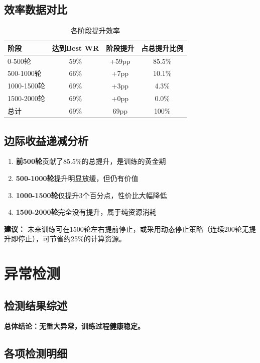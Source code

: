 \documentclass[12pt,a4paper]{article}
\begin{document}
\subsection{效率数据对比}
\begin{table}[H]
\centering
\caption{各阶段提升效率}
\begin{tabular}{lccc}
\toprule
\textbf{阶段} & \textbf{达到Best WR} & \textbf{阶段提升} & \textbf{占总提升比例} \\
\midrule
0-500轮 & 59\% & +59pp & 85.5\% \\
500-1000轮 & 66\% & +7pp & 10.1\% \\
1000-1500轮 & 69\% & +3pp & 4.3\% \\
1500-2000轮 & 69\% & +0pp & 0.0\% \\
\midrule
总计 & 69\% & 69pp & 100\% \\
\bottomrule
\end{tabular}
\end{table}

\subsection{边际收益递减分析}
\begin{enumerate}
\item \textbf{前500轮}贡献了85.5\%的总提升，是训练的黄金期
\item \textbf{500-1000轮}提升明显放缓，但仍有价值
\item \textbf{1000-1500轮}仅提升3个百分点，性价比大幅降低
\item \textbf{1500-2000轮}完全没有提升，属于纯资源消耗
\end{enumerate}

\textcolor{warning}{\textbf{建议：}} 未来训练可在1500轮左右提前停止，或采用动态停止策略（连续200轮无提升即停止），可节省约25\%的计算资源。

\newpage

\section{异常检测}

\subsection{检测结果综述}

\textcolor{success}{\textbf{总体结论：无重大异常，训练过程健康稳定。}}

\subsection{各项检测明细}
\end{document}
